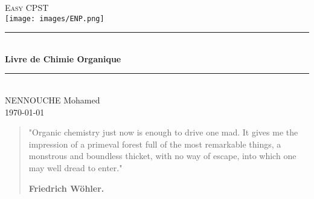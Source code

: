 \documentclass[a4paper, oneside]{book}
\begin{document}
\large
\frontmatter
\begin{titlepage}
\newcommand{\HRule}{\rule{\linewidth}{0.5mm}}
\center
\textsc{\LARGE{Easy CPST}}\\[5cm]
\texttt{[image: images/ENP.png]} \\[1cm]
\HRule \\[0.4cm]
{ \huge \bfseries Livre de Chimie Organique\\[0.15cm]}
\HRule \\[1.5cm]

\large
NENNOUCHE Mohamed\\[1cm]
\today\\
\end{titlepage}
\newpage
{}
\begin{quotation}
\LARGE{"Organic chemistry just now is enough to drive one mad. It gives me the impression of a primeval forest full of the most remarkable things, a monstrous and boundless thicket, with no way of escape, into which one may well dread to enter."\\
\begin{center}
    \textbf{Friedrich Wöhler.}
\end{center}}
\end{quotation}
\newpage
\vspace*{\fill}
\end{document}
